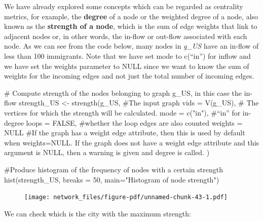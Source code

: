 \documentclass[
  letterpaper,
  DIV=11,
  numbers=noendperiod]{scrreprt}
\newenvironment{Shaded}{\begin{snugshade}}{\end{snugshade}}
\newcommand{\AttributeTok}[1]{\textcolor[rgb]{0.40,0.45,0.13}{#1}}
\newcommand{\CommentTok}[1]{\textcolor[rgb]{0.37,0.37,0.37}{#1}}
\newcommand{\ConstantTok}[1]{\textcolor[rgb]{0.56,0.35,0.01}{#1}}
\newcommand{\DecValTok}[1]{\textcolor[rgb]{0.68,0.00,0.00}{#1}}
\newcommand{\FunctionTok}[1]{\textcolor[rgb]{0.28,0.35,0.67}{#1}}
\newcommand{\NormalTok}[1]{\textcolor[rgb]{0.00,0.23,0.31}{#1}}
\newcommand{\OtherTok}[1]{\textcolor[rgb]{0.00,0.23,0.31}{#1}}
\newcommand{\StringTok}[1]{\textcolor[rgb]{0.13,0.47,0.30}{#1}}
\begin{document}
We have already explored some concepts which can be regarded as
centrality metrics, for example, the \textbf{degree} of a node or the
weighted degree of a node, also known as the \textbf{strength of a
node}, which is the sum of edge weights that link to adjacent nodes or,
in other words, the in-flow or out-flow associated with each node. As we
can see from the code below, many nodes in \emph{g\_US} have an in-flow
of less than 100 immigrants. Note that we have set mode to c(``in'') for
inflow and we have set the weights parameter to NULL since we want to
know the sum of weights for the incoming edges and not just the total
number of incoming edges.

\begin{Shaded}
\begin{Highlighting}[]
\CommentTok{\# Compute strength of the nodes belonging to graph g\_US, in this case the in{-}flow}
\NormalTok{strength\_US }\OtherTok{\textless{}{-}} \FunctionTok{strength}\NormalTok{(g\_US, }\CommentTok{\#The input graph}
  \AttributeTok{vids =} \FunctionTok{V}\NormalTok{(g\_US), }\CommentTok{\# The vertices for which the strength will be calculated.}
  \AttributeTok{mode =} \FunctionTok{c}\NormalTok{(}\StringTok{"in"}\NormalTok{), }\CommentTok{\#“in” for in{-}degree}
  \AttributeTok{loops =} \ConstantTok{FALSE}\NormalTok{, }\CommentTok{\#whether the loop edges are also counted}
  \AttributeTok{weights =} \ConstantTok{NULL} \CommentTok{\#If the graph has a weight edge attribute, then this is used by default when weights=NULL. If the graph does not have a weight edge attribute and this argument is NULL, then a warning is given and degree is called.}
\NormalTok{)}
  
\CommentTok{\#Produce histogram of the frequency of nodes with a certain strength}
\FunctionTok{hist}\NormalTok{(strength\_US, }\AttributeTok{breaks =} \DecValTok{50}\NormalTok{, }\AttributeTok{main=}\StringTok{"Histogram of node strength"}\NormalTok{)}
\end{Highlighting}
\end{Shaded}

\begin{figure}[H]

{\centering \texttt{[image: network\_files/figure-pdf/unnamed-chunk-43-1.pdf]}

}

\end{figure}

We can check which is the city with the maximum strength:
\end{document}
